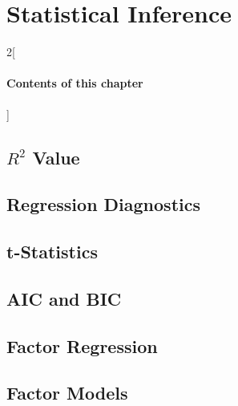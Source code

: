 \chapter{Statistical Inference}
\label{chp:statisticalinference}

\begin{multicols}{2}[\subsubsection*{Contents of this chapter}]
\end{multicols}


















\section{$R^2$ Value}

\section{Regression Diagnostics}

\section{t-Statistics}

\section{AIC and BIC}

\section{Factor Regression}

\section{Factor Models}


